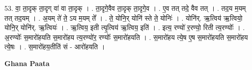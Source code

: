 \documentclass[17pt]{extarticle}
\begin{document}
53. वा॒ ता॒दृक् ता॒दृग् वा॑ वा ता॒दृक् । . ता॒दृगे॒वैव ता॒दृक् ता॒दृगे॒व । . ए॒व तत् तदे॒ वैव तत् । . तद॒य म॒यम् तत् तद॒यम् । . अ॒यम् ते॑ ते॒ ऽय म॒यम् ते᳚ । . ते॒ योनि॒र् योनि॑ स्ते ते॒ योनिः॑ । . योनि॑र्. ऋ॒त्विय॑ ऋ॒त्वियो॒ योनि॒र् योनि॑र्. ऋ॒त्वियः॑ । . ऋ॒त्विय॒ इती त्यृ॒त्विय॑ ऋ॒त्विय॒ इति॑ । . इत्य॒ रण्यो॑ र॒रण्यो॒ रिती त्य॒रण्योः᳚ । . अ॒रण्योः᳚ स॒मारो॑हयति स॒मारो॑हय त्य॒रण्यो॑र॒ रण्योः᳚ स॒मारो॑हयति । . स॒मारो॑हय त्ये॒ष ए॒ष स॒मारो॑हयति स॒मारो॑हय त्ये॒षः । . स॒मारो॑हय॒तीति॑ सं - आरो॑हयति । \newline

\textbf{Ghana Paata } \newline
\end{document}
